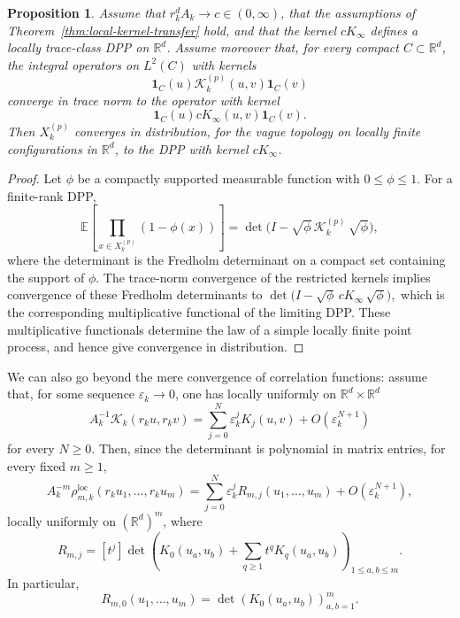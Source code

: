\documentclass[12pt,a4paper,reqno]{article}
\theoremstyle{thmstyleone}
\newtheorem{proposition}[theorem]{Proposition}
\theoremstyle{thmstylethree}
\theoremstyle{thmstyletwo}
\numberwithin{equation}{subsection}
\def\leq{\leqslant}
\begin{document}
\begin{proposition}\label{prop:local-process-transfer}
Assume that $r_k^dA_k\to c\in(0,\infty)$, that the assumptions of Theorem~\ref{thm:local-kernel-transfer} hold, and that the kernel $cK_\infty$ defines a locally trace-class DPP on $\mathbb R^d$. Assume moreover that, for every compact $C\subset\mathbb R^d$, the integral operators on $L^2(C)$ with kernels
\[
    \mathbf 1_C(u)\mathcal K_k^{(p)}(u,v)\mathbf 1_C(v)
\]
converge in trace norm to the operator with kernel
\[
    \mathbf 1_C(u)cK_\infty(u,v)\mathbf 1_C(v).
\]
Then $X_k^{(p)}$ converges in distribution, for the vague topology on locally finite configurations in $\mathbb R^d$, to the DPP with kernel $cK_\infty$.
\end{proposition}

\begin{proof}
Let $\phi$ be a compactly supported measurable function with $0\leq\phi\leq1$. For a finite-rank DPP,
\[
    \mathbb E\left[\prod_{x\in X_k^{(p)}}(1-\phi(x))\right]
    =
    \det\bigl(I-\sqrt{\phi}\,\mathcal K_k^{(p)}\,\sqrt{\phi}\bigr),
\]
where the determinant is the Fredholm determinant on a compact set containing the support of $\phi$. The trace-norm convergence of the restricted kernels implies convergence of these Fredholm determinants to $\det\bigl(I-\sqrt{\phi}\,cK_\infty\,\sqrt{\phi}\bigr),$ which is the corresponding multiplicative functional of the limiting DPP. These multiplicative functionals determine the law of a simple locally finite point process, and hence give convergence in distribution.
\end{proof}

We can also go beyond the mere convergence of correlation functions: assume that, for some sequence \(\varepsilon_k\to0\), one has locally uniformly on \(\mathbb R^d\times\mathbb R^d\)
\[
A_k^{-1}\mathcal K_k(r_ku,r_kv) =\sum_{j=0}^N \varepsilon_k^j K_j(u,v)+O(\varepsilon_k^{N+1})
\]
for every \(N\ge0\). Then, since the determinant is polynomial in matrix entries, for every fixed \(m\ge1\),
\begin{equation}\label{eq:expansion-correl}
A_k^{-m}\rho_{m,k}^{\mathrm{loc}}(r_ku_1,\ldots,r_ku_m)=\sum_{j=0}^N \varepsilon_k^j R_{m,j}(u_1,\ldots,u_m)+O(\varepsilon_k^{N+1}),
\end{equation}
locally uniformly on \((\mathbb R^d)^m\), where
\[
R_{m,j}=[t^j]\det\left(K_0(u_a,u_b)+\sum_{q\ge1}t^qK_q(u_a,u_b)\right)_{1\le a,b\le m}.
\]
In particular,
\[
R_{m,0}(u_1,\ldots,u_m)=\det(K_0(u_a,u_b))_{a,b=1}^m.
\]
\end{document}
